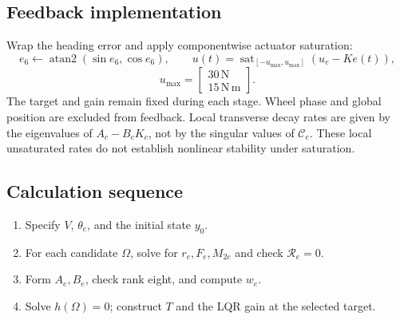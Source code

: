 \documentclass[10pt]{article}
\numberwithin{equation}{section}
\begin{document}
\subsection{Feedback implementation}
Wrap the heading error and apply componentwise actuator saturation:
\begin{equation}
e_6\leftarrow\operatorname{atan2}(\sin e_6,\cos e_6),\qquad
\boxed{u(t)=\operatorname{sat}_{[-u_{\max},u_{\max}]}(u_e-Ke(t)),}
\end{equation}
\begin{equation}
u_{\max}=\begin{bmatrix}30\,\mathrm N\\15\,\mathrm{N\,m}\end{bmatrix}.
\end{equation}
The target and gain remain fixed during each stage. Wheel phase and global
position are excluded from feedback. Local transverse decay rates are given
by the eigenvalues of $A_c-B_cK_c$, not by the singular values of $\mathcal C_e$.
These local unsaturated rates do not establish nonlinear stability under saturation.

\subsection*{Calculation sequence}
\begin{enumerate}
\item Specify $V$, $\theta_e$, and the initial state $y_0$.
\item For each candidate $\Omega$, solve for $r_e,F_e,M_{2e}$ and check
$\mathcal R_e=0$.
\item Form $A_e,B_e$, check rank eight, and compute $w_e$.
\item Solve $h(\Omega)=0$; construct $T$ and the LQR gain at the selected target.
\end{enumerate}



\end{document}
